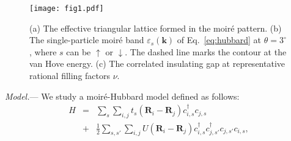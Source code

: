 \documentclass[aps,prl,floatfix,twocolumn]{revtex4-1}
\begin{document}
\begin{figure}[t]
	\centering
	\texttt{[image: fig1.pdf]}
	\caption{(a) The effective triangular lattice formed in the moir\'e pattern. (b) The single-particle moir\'e band $\varepsilon_s(\boldsymbol{k}) $ of Eq.~\eqref{eq:hubbard} at $ \theta=3^\circ $, where $s$ can be $\uparrow$ or $\downarrow$. The dashed line marks the contour at the  van Hove energy. (c) The correlated insulating gap at representative rational filling factors $ \nu $. }
	\label{fig:fig1}
\end{figure}

\textit{Model.}--- We study a moir\'e-Hubbard model defined as follows:
\begin{eqnarray}\label{eq:hubbard}
	H&=&\sum_{s}\sum_{i,j}^{} t_{s}\left(\bm{R}_i-\bm{R}_j\right) c_{i,s}^\dagger c_{j,s}\nonumber\\
	&+&\frac{1}{2}\sum_{s,s'}\sum_{i,j}U(\bm{R}_i-\bm{R}_j) c_{i,s}^\dagger c_{j,s'}^\dagger c_{j,s'} c_{i,s},
\end{eqnarray}
\end{document}
